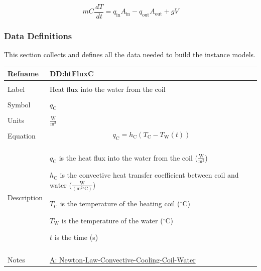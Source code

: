 \documentclass[12pt]{article}
\begin{document}
\begin{displaymath}
m C \frac{\,dT}{\,dt}={q_{\text{in}}} {A_{\text{in}}}-{q_{\text{out}}} {A_{\text{out}}}+g V
\end{displaymath}
\subsubsection{Data Definitions}
\label{Sec:DDs}
This section collects and defines all the data needed to build the instance models.

\vspace{\baselineskip}
\noindent
\begin{minipage}{\textwidth}
\begin{tabular}{>{\raggedright}p{}>{\raggedright\arraybackslash}p{}}
\toprule \textbf{Refname} & \textbf{DD:htFluxC}
\label{DD:htFluxC}
\\ \midrule \\
Label & Heat flux into the water from the coil
        
\\ \midrule \\
Symbol & ${q_{\text{C}}}$
         
\\ \midrule \\
Units & $\frac{\text{W}}{\text{m}^{2}}$
        
\\ \midrule \\
Equation & \begin{displaymath}
           {q_{\text{C}}}={h_{\text{C}}} \left({T_{\text{C}}}-{T_{\text{W}}}\left(t\right)\right)
           \end{displaymath}
\\ \midrule \\
Description & \begin{symbDescription}
              \item{${q_{\text{C}}}$ is the heat flux into the water from the coil ($\frac{\text{W}}{\text{m}^{2}}$)}
              \item{${h_{\text{C}}}$ is the convective heat transfer coefficient between coil and water ($\frac{\text{W}}{(\text{m}^{2}{}^{\circ}\text{C})}$)}
              \item{${T_{\text{C}}}$ is the temperature of the heating coil (${}^{\circ}$C)}
              \item{${T_{\text{W}}}$ is the temperature of the water (${}^{\circ}$C)}
              \item{$t$ is the time (s)}
              \end{symbDescription}
\\ \midrule \\
Notes & \hyperref[assumpLCCCW]{A: Newton-Law-Convective-Cooling-Coil-Water}
        

\end{tabular}
\end{minipage}
\end{document}
